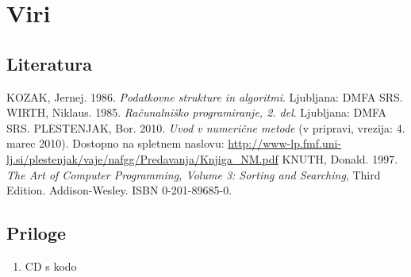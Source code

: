 \documentclass[a4paper,oneside,12pt]{article}
\begin{document}
\section{Viri}


\subsection{Literatura}
\vspace{-1cm}
\begin{thebibliography}{99}
   {KOZAK, Jernej. 1986. \emph{Podatkovne strukture in algoritmi}. Ljubljana: DMFA SRS. }
   {WIRTH, Niklaus. 1985. \emph{Računalniško programiranje, 2. del}. Ljubljana: DMFA SRS. }
   {PLESTENJAK, Bor. 2010. \emph{Uvod v numerične
    metode} (v pripravi, vrezija: 4. marec 2010).
    Dostopno na spletnem naslovu: \url{http://www-lp.fmf.uni-lj.si/plestenjak/vaje/nafgg/Predavanja/Knjiga_NM.pdf}}
   {KNUTH, Donald. 1997. \emph{The Art of Computer Programming, Volume 3: Sorting and
    Searching}, Third Edition. Addison-Wesley. ISBN 0-201-89685-0.}
\end{thebibliography}

\subsection{Priloge}
\begin{enumerate}
  \item \label{pril:koda} CD s kodo
\end{enumerate}
\end{document}

